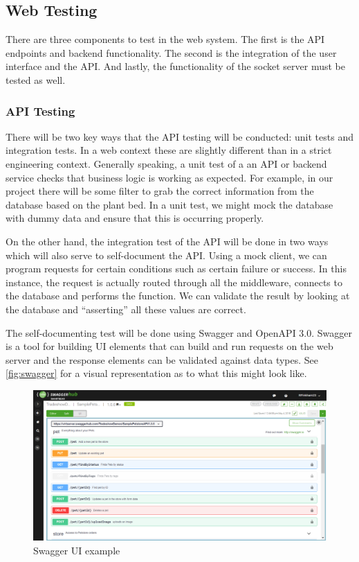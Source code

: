 \subsection{Web Testing}\label{sec:web_subsystem_testing}
There are three components to test in the web system. The first is the API endpoints and backend functionality. The second is the integration of the user interface and the API. And lastly, the functionality of the socket server must be tested as well.
\subsubsection{API Testing} \label{sec:api-test}
There will be two key ways that the API testing will be conducted: unit tests and integration tests. In a web context these are slightly different than in a strict engineering context. Generally speaking, a unit test of a an API or backend service checks that business logic is working as expected. For example, in our project there will be some filter to grab the correct information from the database based on the plant bed. In a unit test, we might mock the database with dummy data and ensure that this is occurring properly.

On the other hand, the integration test of the API will be done in two ways which will also serve to self-document the API. Using a mock client, we can program requests for certain conditions such as certain failure or success. In this instance, the request is actually routed through all the middleware, connects to the database and performs the function. We can validate the result by looking at the database and ``asserting'' all these values are correct.

The self-documenting test will be done using Swagger and OpenAPI 3.0. Swagger is a tool for building UI elements that can build and run requests on the web server and the response elements can be validated against data types. See \autoref{fig:swagger} for a visual representation as to what this might look like.

\begin{figure}[H]
    \caption{Swagger UI example}
    \label{fig:swagger}
    \centering
    \includegraphics[width=\textwidth]{images/Swagger.png}
\end{figure}

